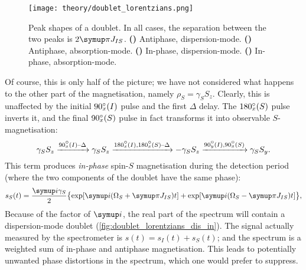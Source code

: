 \begin{figure}[htbp]
    \centering
    \texttt{[image: theory/doublet\_lorentzians.png]}%
    {\label{fig:doublet_lorentzians_dis_anti}}%
    {\label{fig:doublet_lorentzians_abs_anti}}%
    {\label{fig:doublet_lorentzians_dis_in}}%
    {\label{fig:doublet_lorentzians_abs_in}}%
    \caption[Absorption- and dispersion-mode in-phase and antiphase doublets]{
        Peak shapes of a doublet.
        In all cases, the separation between the two peaks is $2\cpi J_{IS}$.
        \textbf{()} Antiphase, dispersion-mode.
        \textbf{()} Antiphase, absorption-mode.
        \textbf{()} In-phase, dispersion-mode.
        \textbf{()} In-phase, absorption-mode.
    }
    \label{fig:doublet_lorentzians}
\end{figure}

Of course, this is only half of the picture; we have not considered what happens to the other part of the magnetisation, namely $\rho_S = \gamma_S S_z$.
Clearly, this is unaffected by the initial $\angang{90}{x}(I)$ pulse and the first $\Delta$ delay.
The $\angang{180}{x}(S)$ pulse inverts it, and the final $\angang{90}{x}(S)$ pulse in fact transforms it into observable $S$-magnetisation:
\begin{equation}
    \label{eq:inept_prodop_s}
    \gamma_S S_z \xrightarrow{\angang{90}{x}(I)\text{--}\Delta} \gamma_S S_z
    \xrightarrow{\angang{180}{x}(I),\angang{180}{x}(S)\text{--}\Delta} -\gamma_S S_z
    \xrightarrow{\angang{90}{y}(I),\angang{90}{x}(S)} \gamma_S S_y.
\end{equation}
This term produces \textit{in-phase} spin-$S$ magnetisation during the detection period (where the two components of the doublet have the same phase):
\begin{equation}
    \label{eq:inept_fid_S}
    s_S(t) = \frac{\mi\gamma_S}{2}\bigl\{\exp[\mi(\Omega_S + \cpi J_{IS})t] + \exp[\mi(\Omega_S - \cpi J_{IS})t]\bigr\},
\end{equation}
Because of the factor of $\mi$, the real part of the spectrum will contain a dispersion-mode doublet (\cref{fig:doublet_lorentzians_dis_in}).
The signal actually measured by the spectrometer is $s(t) = s_I(t) + s_S(t)$; and the spectrum is a weighted sum of in-phase and antiphase magnetisation.
This leads to potentially unwanted phase distortions in the spectrum, which one would prefer to suppress.

